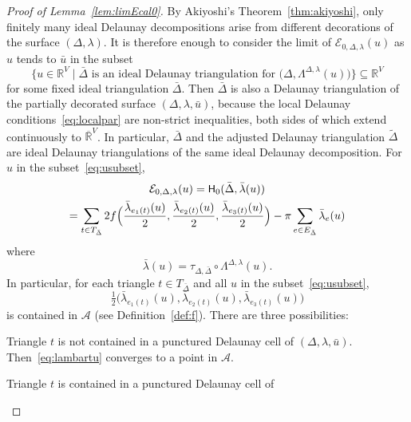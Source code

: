 \documentclass[a4paper, 11pt]{article}
\newcommand{\R}{\mathbb{R}}
\newcommand{\Rbar}{\overline{\R}}
\newcommand{\Deltil}{\widetilde{\Delta}}
\newcommand{\Delbar}{\bar{\Delta}}
\newcommand{\lambar}{\bar{\lambda}}
\newcommand{\Acal}{\mathcal{A}}
\newcommand{\Ecal}{\mathcal{E}}
\newcommand{\Hsf}{\scalebox{0.94}{$\mathsf{H}$}}
\newcommand{\ubar}{\bar{u}}
\theoremstyle{plain}
\theoremstyle{definition}
\begin{document}
\begin{proof}[Proof of Lemma~\ref{lem:limEcal0}]
  By Akiyoshi's Theorem~\ref{thm:akiyoshi}, only finitely many ideal
  Delaunay decompositions arise from different decorations of the
  surface $(\Delta,\lambda)$. It is therefore enough to consider the
  limit of $\Ecal_{0,\Delta,\lambda}(u)$ as $u$ tends to $\ubar$ in
  the subset
  \begin{equation}
    \label{eq:usubset}
    \big\{u\in\R^{V}\;\big|\;
    \Delbar\text{ is an ideal Delaunay triangulation for }
    \big(\Delta,\Lambda^{\Delta,\lambda}(u)\big)
    \big\}\subseteq\R^{V}
   \end{equation}
   for some fixed ideal triangulation $\Delbar$. Then $\Delbar$ is
   also a Delaunay triangulation of the partially decorated surface
   $(\Delta,\lambda,\ubar)$, because the local Delaunay
   conditions~\eqref{eq:localpar} are non-strict inequalities, both
   sides of which extend continuously to $\Rbar^{V}$. In particular,
   $\Delbar$ and the adjusted Delaunay triangulation $\Deltil$ are
   ideal Delaunay triangulations of the same ideal Delaunay
   decomposition. For $u$ in the subset~\eqref{eq:usubset},
  \begin{multline}
    \label{eq:Ecal0H0}
    \Ecal_{0,\Delta,\lambda}(u)=\Hsf_{0}(\Delbar,\lambar(u))\\
    =\sum_{t\in T_{\Delbar}} 
      2f \Big(
      \frac{\lambar_{e_{1}(t)}(u)}{2}, 
      \frac{\lambar_{e_{2}(t)}(u)}{2},
      \frac{\lambar_{e_{3}(t)}(u)}{2} 
      \Big) 
      -\pi\sum_{e\in E_{\Delbar}}\lambar_{e}(u)
  \end{multline}
  where 
  \begin{equation*}
    \lambar(u)=\tau_{\Delta,\Delbar}\circ\Lambda^{\Delta,\lambda}(u).
  \end{equation*}
  In particular, for each triangle $t\in T_{\Delbar}$ and all $u$ in the
  subset~\eqref{eq:usubset}, 
  \begin{equation}
    \label{eq:lambartu}
    \tfrac{1}{2}
    \big(
    \lambar_{e_{1}(t)}(u), 
    \lambar_{e_{2}(t)}(u),
    \lambar_{e_{3}(t)}(u) 
    \big)
  \end{equation}
  is contained in $\Acal$ (see Definition~\ref{def:f}). There are
  three possibilities:
  \begin{compactenum}[(i)]
  \item Triangle $t$ is not contained in a punctured Delaunay cell of
    $(\Delta,\lambda,\ubar)$. Then~\eqref{eq:lambartu}
    converges to a point in $\Acal$.
  \item Triangle $t$ is contained in a punctured Delaunay cell of

\end{compactenum}
\end{proof}
\end{document}
